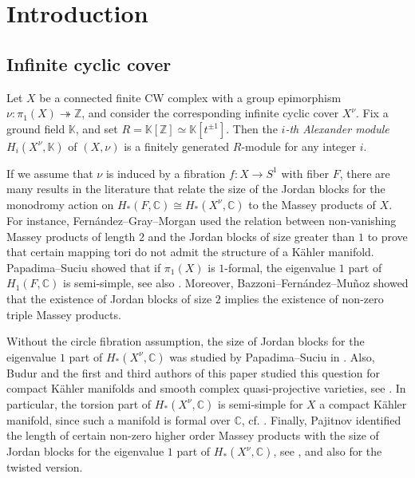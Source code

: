 \documentclass[12pt,leqno,twoside]{amsart}
\theoremstyle{plain}
\theoremstyle{definition}
\newcommand{\C}{\mathbb{C}}
\newcommand{\Z}{\mathbb{Z}}
\newcommand{\K}{\mathbb{K}}
\begin{document}
\maketitle


\section{Introduction}


\subsection{Infinite cyclic cover}

Let $X$ be a connected finite CW complex with a group epimorphism $\nu \colon \pi_1(X)\twoheadrightarrow \Z$, and consider the corresponding infinite cyclic cover $X^{\nu}$.  Fix a ground field $\K$, and set $R=\K[\Z]\simeq \K[t^{\pm 1}]$.  Then the {\it $i$-th Alexander module} $H_i(X^\nu, \K)$ of $(X,\nu)$ is a finitely generated $R$-module for any integer $i$. 

If we assume that $\nu$ is induced by a fibration $f\colon X\to S^1$ with fiber $F$, there are many results in the literature that relate  the size of the Jordan blocks for the monodromy action on $H_*(F,\C)\cong H_*(X^\nu,\C)$ to the Massey products of $X$.
For instance, Fern\'andez--Gray--Morgan  \cite{FGM} used the relation between non-vanishing Massey products of length $2$ and the Jordan blocks
of size greater than $1$ to prove that certain mapping tori do not admit the structure of a K\"ahler manifold.
Papadima--Suciu  \cite{PS10B} showed that if $\pi_1(X)$ is $1$-formal,  the eigenvalue $1$ part of $H_1(F,\C)$ is semi-simple, see also \cite{PS10}. Moreover, Bazzoni--Fern\'andez--Mu\~noz \cite{BFM} showed that the existence of Jordan blocks of size $2$ implies the existence of non-zero triple Massey products.

Without the circle fibration assumption, the size of Jordan blocks for the eigenvalue $1$ part of $H_*(X^\nu,\C)$ was studied by Papadima--Suciu in \cite[Section 9]{PS10}. Also, Budur and the first and third authors of this paper studied this question for compact K\"ahler manifolds and smooth complex quasi-projective varieties, see \cite{BLW}. In particular, the torsion part of $H_*(X^\nu,\C)$ is semi-simple for $X$ a compact K\"ahler manifold, since such a manifold is formal over $\C$, cf. \cite{DGMS}. Finally, Pajitnov identified the length of certain non-zero higher order Massey products with the size of Jordan
blocks for the eigenvalue $1$ part of $H_*(X^\nu,\C)$, see \cite[Theorem 5.1]{Paj17}, and also \cite{Paj19} for the twisted version. 
\end{document}
